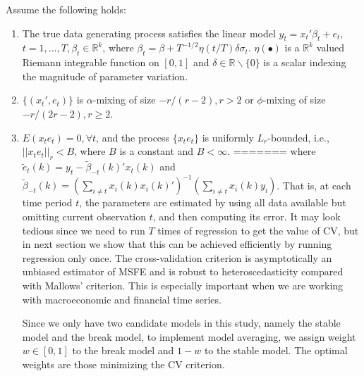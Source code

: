 \begin{assumption}\label{asump:1}
Assume the following holds:
\begin{enumerate}
	\item The true data generating process satisfies the linear model $y_t = x_t'\beta_t + e_t$, $t=1,...,T,\beta_t \in \mathbb{R}^k$, where $\beta_t = \beta + T^{-1/2}\eta(t/T)\delta\sigma_t$. $\eta(\bullet)$ is a $\mathbb{R}^k$ valued Riemann integrable function on $[0,1]$ and $\delta \in \mathbb{R}\backslash\{0\}$ is a scalar indexing the magnitude of parameter variation.
	\item $\{(x_t',e_t)\}$ is $\alpha$-mixing of size $-r/(r-2),r > 2$ or $\phi$-mixing of size $-r/(2r-2),r \geq 2$.
    \item $E(x_t e_t) = 0, \forall t$, and the process $\{x_t e_t\}$ is uniformly $L_r$-bounded, i.e., $||x_t e_t||_{r} < B$, where $B$ is a constant and $B < \infty$.
=======
where $\tilde{e}_{t}(k) = y_t - \tilde{\beta}_{-t}(k)'x_t(k)$ and $\tilde{\beta}_{-t}(k) = (\sum_{i\not= t}x_i(k) x_i(k)')^{-1}(\sum_{i\not= t}x_i(k) y_i)$. That is, at each time period $t$, the parameters are estimated by using all data available but omitting current observation $t$, and then computing its error. It may look tedious since we need to run $T$ times of regression to get the value of CV, but in next section we show that this can be achieved efficiently by running regression only once. The cross-validation criterion is asymptotically an unbiased estimator of MSFE and is robust to heteroscedasticity compared with Mallows' criterion. This is especially important when we are working with macroeconomic and financial time series.

Since we only have two candidate models in this study, namely the stable model and the break model, to implement model averaging, we assign weight $w \in [0,1]$ to the break model and $1 - w$ to the stable model. The optimal weights are those minimizing the CV criterion.

\end{enumerate}
\end{assumption}
